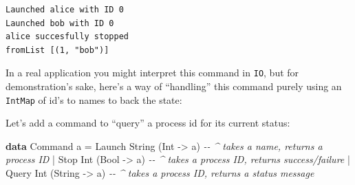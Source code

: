 \documentclass[]{article}
\newenvironment{Shaded}{}{}
\newcommand{\CommentTok}[1]{\textcolor[rgb]{0.38,0.63,0.69}{\textit{#1}}}
\newcommand{\DataTypeTok}[1]{\textcolor[rgb]{0.56,0.13,0.00}{#1}}
\newcommand{\KeywordTok}[1]{\textcolor[rgb]{0.00,0.44,0.13}{\textbf{#1}}}
\newcommand{\NormalTok}[1]{#1}
\newcommand{\OperatorTok}[1]{\textcolor[rgb]{0.40,0.40,0.40}{#1}}
\newcommand{\OtherTok}[1]{\textcolor[rgb]{0.00,0.44,0.13}{#1}}
\begin{document}
\begin{verbatim}
Launched alice with ID 0
Launched bob with ID 0
alice succesfully stopped
fromList [(1, "bob")]
\end{verbatim}

In a real application you might interpret this command in \texttt{IO}, but for
demonstration's sake, here's a way of ``handling'' this command purely using an
\texttt{IntMap} of id's to names to back the state:

Let's add a command to ``query'' a process id for its current status:

\begin{Shaded}
\begin{Highlighting}[]
\KeywordTok{data} \DataTypeTok{Command}\NormalTok{ a }\OtherTok{=}
    \DataTypeTok{Launch} \DataTypeTok{String}\NormalTok{ (}\DataTypeTok{Int} \OtherTok{{-}\textgreater{}}\NormalTok{ a)    }\CommentTok{{-}{-} \^{} takes a name, returns a process ID}
  \OperatorTok{|} \DataTypeTok{Stop} \DataTypeTok{Int}\NormalTok{ (}\DataTypeTok{Bool} \OtherTok{{-}\textgreater{}}\NormalTok{ a)        }\CommentTok{{-}{-} \^{} takes a process ID, returns success/failure}
  \OperatorTok{|} \DataTypeTok{Query} \DataTypeTok{Int}\NormalTok{ (}\DataTypeTok{String} \OtherTok{{-}\textgreater{}}\NormalTok{ a)     }\CommentTok{{-}{-} \^{} takes a process ID, returns a status message}


\end{Highlighting}
\end{Shaded}
\end{document}
